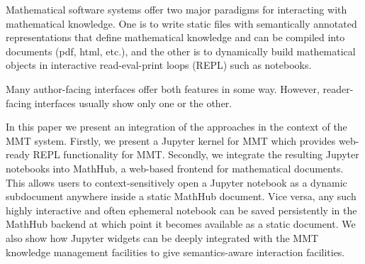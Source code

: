 Mathematical software systems offer two major paradigms for interacting with mathematical knowledge.
One is to write static files with semantically annotated representations that define mathematical knowledge and can be compiled into documents (pdf, html, etc.), and the other is to dynamically build mathematical objects in interactive read-eval-print loops (REPL) such as notebooks.

Many author-facing interfaces offer both features in some way.
However, reader-facing interfaces usually show only one or the other.

In this paper we present an integration of the approaches in the context of the MMT system.
Firstly, we present a Jupyter kernel for MMT which provides web-ready REPL functionality for MMT.
Secondly, we integrate the resulting Jupyter notebooks into MathHub, a web-based frontend for mathematical documents.
This allows users to context-sensitively open a Jupyter notebook as a dynamic subdocument anywhere inside a static MathHub document.
Vice versa, any such highly interactive and often ephemeral notebook can be saved persistently in the MathHub backend at which point it becomes available as a static document.
We also show how Jupyter widgets can be deeply integrated with the MMT knowledge management facilities to give semantics-aware interaction facilities.


